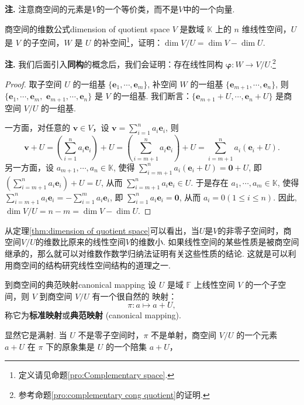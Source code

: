 \documentclass[12pt, a4paper,newtx]{ctexart}
\newenvironment{remark}{\dbend\textbf{注. }}{}{}
\begin{document}
\begin{remark}
	注意商空间的元素是$V$的一个等价类，而不是$V$中的一个向量. 
\end{remark}
\begin{theorem}{商空间的维数公式}{dimension of quotient space}
	 $V$ 是数域 $\mathbb K$ 上的 $n$ 维线性空间，$U$ 是 $V$ 的子空间，$W$ 是 $U$ 的补空间\footnote{定义请见命题\ref{pro:Complementary space}. }，证明：$\dim V / U = \dim V - \dim U$. 
\end{theorem}
\begin{remark}
	我们后面引入\textbf{同构}的概念后，我们会证明：存在线性同构 $\bm\varphi : W \rightarrow V / U.$\footnote{参考命题\ref{pro:complementary cong quotient}的证明.}
\end{remark}
\begin{proof}
	取子空间 $U$ 的一组基 $\{\bm e_1, \cdots, \bm e_m\}$, 补空间 $W$ 的一组基 $\{\bm e_{m+1}, \cdots, \bm e_n\}$, 则 $\{\bm e_1, \cdots,\bm e_m,$
	$\bm e_{m+1}, \cdots, \bm e_n\}$ 是 $V$ 的一组基. 我们断言：$\{\bm e_{m+1} + U, \cdots,\bm e_n + U\}$ 是商空间 $V / U$ 的一组基. 
	
	一方面，对任意的 $\bm v \in V$，设 $\displaystyle \bm v = \sum_{i=1}^{n} a_i \bm e_i$, 则
	\[
	\bm v + U = \left( \sum_{i=1}^{n} a_i\bm e_i \right) + U = \left( \sum_{i=m+1}^{n} a_i\bm e_i \right) + U = \sum_{i=m+1}^{n} a_i (\bm e_i + U).
	\]
	另一方面，设 $a_{m+1}, \cdots, a_n \in\mathbb K$, 使得 $\displaystyle \sum_{i=m+1}^{n} a_i (\bm e_i + U) =\bm 0 + U$, 即$\displaystyle \left( \sum_{i=m+1}^{n} a_i\bm e_i \right) + U = U$, 从而 $\displaystyle \sum_{i=m+1}^{n} a_i\bm e_i \in U$. 于是存在 $a_1, \cdots, a_m \in\mathbb K$, 使得 $\displaystyle \sum_{i=m+1}^{n} a_i\bm e_i = - \sum_{i=1}^{m} a_i\bm e_i$, 即 $\displaystyle \sum_{i=1}^{n} a_i\bm e_i = \bm 0$, 从而 $a_i = 0 (1 \leqslant i \leqslant n).$ 因此, $\dim V / U = n - m = \dim V - \dim U.$
\end{proof}
从定理\ref{thm:dimension of quotient space}可以看出，当$U$是$V$的非零子空间时，商空间$V/U$的维数比原来的线性空间$V$的维数小. 如果线性空间的某些性质是被商空间继承的，那么就可以对维数作数学归纳法证明有关这些性质的结论. 这就是可以利用商空间的结构研究线性空间结构的道理之一. 
\begin{definition}{到商空间的典范映射}{canonical mapping}
	设 $U$ 是域 $\mathbb F$ 上线性空间 $V$ 的一个子空间，则 $V$ 到商空间 $V/U$ 有一个很自然的
	映射：
	\[
	\pi : a \longmapsto a + U,
	\]
	称它为\textbf{标准映射}或\textbf{典范映射} (canonical mapping). 
\end{definition}
显然它是满射. 当 $U
$ 不是零子空间时，$\pi$ 不是单射，商空间 $V/U$ 的一个元素 $a+U$ 在 $\pi$ 下的原象集是 $U$ 的一个陪集 $a+U$，
\end{document}
